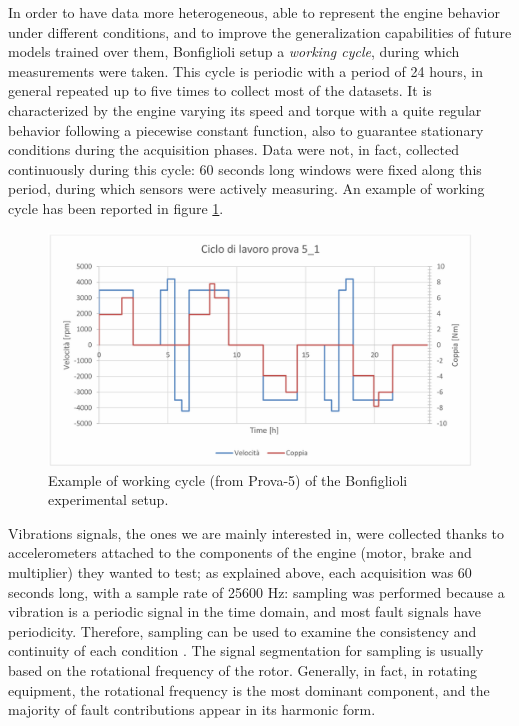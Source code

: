 \documentclass[../main.tex]{subfiles}
\begin{document}
In order to have data more heterogeneous, able to represent the engine behavior under different conditions, and to improve the generalization capabilities of future models trained over them, Bonfiglioli setup a \textit{working cycle}, during which measurements were taken. This cycle is periodic with a period of 24 hours, in general repeated up to five times to collect most of the datasets. It is characterized by the engine varying its speed and torque with a quite regular behavior following a piecewise constant function, also to guarantee stationary conditions during the acquisition phases. Data were not, in fact, collected continuously during this cycle: 60 seconds long windows were fixed along this period, during which sensors were actively measuring. An example of working cycle has been reported in figure \ref{fig:bonfiglioli_example_working_cycle}.
\begin{figure}[!ht]
	\centering
	\includegraphics[width=\textwidth]{pictures/bonfiglioli_example_working_cycle}
	\caption{Example of working cycle (from Prova-5) of the Bonfiglioli experimental setup.}
	\label{fig:bonfiglioli_example_working_cycle}
\end{figure}
Vibrations signals, the ones we are mainly interested in, were collected thanks to accelerometers attached to the components of the engine (motor, brake and multiplier) they wanted to test; as explained above, each acquisition was 60 seconds long, with a sample rate of 25600 Hz: sampling was performed because a vibration is a periodic signal in the time domain, and most fault signals have periodicity. Therefore, sampling can be used to examine the consistency and continuity of each condition \cite{deep_learning_vibration_gravity}. 
The signal segmentation for sampling is usually based on the rotational frequency of the
rotor. Generally, in fact, in rotating equipment, the rotational frequency is the most dominant component, and the majority of fault contributions appear in its harmonic form.
\end{document}
